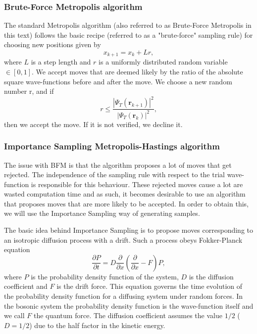 \subsubsection{Brute-Force Metropolis algorithm}
The standard Metropolis algorithm (also referred to as Brute-Force Metropolis in this text) follows the basic recipe (referred to as a "brute-force" sampling rule) for choosing new positions given by
\begin{equation*}
x_{k+1} = x_k + Lr,
\end{equation*}
where $L$ is a step length and $r$ is a uniformly distributed random variable $\in [0,1]$. We accept moves that are deemed likely by the ratio of the absolute square wave-functions before and after the move. We choose a new random number r, and if
\begin{equation}
r \leq \frac{|\Psi_T(\textbf{r}_{k+1})|^2}{|\Psi_T(\textbf{r}_{k})|^2},
\label{eq_accept_move}
\end{equation}
then we accept the move. If it is not verified, we decline it. 

\subsubsection{Importance Sampling Metropolis-Hastings algorithm}
The issue with BFM is that the algorithm proposes a lot of moves that get rejected. The independence of the sampling rule with respect to the trial wave-function is responsible for this behaviour. These rejected moves cause a lot are wasted computation time and as such, it becomes desirable to use an algorithm that proposes moves that are more likely to be accepted. In order to obtain this, we will use the Importance Sampling way of generating samples.

The basic idea behind Importance Sampling is to propose moves corresponding to an isotropic diffusion
process with a drift. Such a process obeys Fokker-Planck equation 
\begin{equation*}
\frac{\partial P}{\partial t} = D\frac{\partial}{\partial x}\left(\frac{\partial}{\partial x}-F\right)P,
\end{equation*}
where $P$ is the probability density function of the system, $D$ is the diffusion coefficient and $F$ is the drift force. This equation governs the time evolution of the probability density function for a diffusing system under random forces. In the bosonic system the probability density function is the wave-function itself and we call $F$ the quantum force. The diffusion coefficient assumes the value $1/2$ ($D = 1/2$) due to the half factor in the kinetic energy. 

